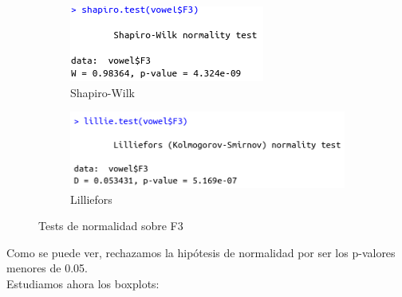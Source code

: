 \begin{figure}[H]
	\centering
	\begin{subfigure}{.5\textwidth}
		\centering
		\includegraphics[width=.7\linewidth]{sw-F3.png}
		\caption{Shapiro-Wilk}
		\label{fig:sw-F3}
	\end{subfigure}%
	\begin{subfigure}{.5\textwidth}
		\centering
		\includegraphics[width=.8\linewidth]{l-F3.png}
		\caption{Lilliefors}
		\label{fig:l-F3}
	\end{subfigure}
	\caption{Tests de normalidad sobre F3}
	\label{fig:normF3}
\end{figure}

Como se puede ver, rechazamos la hipótesis de normalidad por ser los p-valores menores de 0.05. \\

Estudiamos ahora los boxplots:


